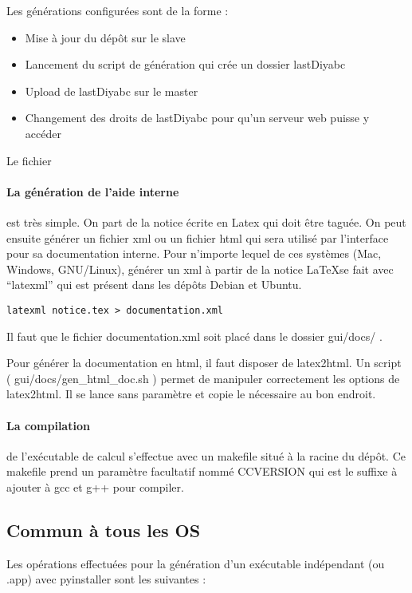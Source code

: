\documentclass[12pt,a4paper]{article}
\begin{document}
    Les générations configurées sont de la forme :\\

    \begin{itemize}
        \item Mise à jour du dépôt sur le slave
        \item Lancement du script de génération qui crée un dossier lastDiyabc
        \item Upload de lastDiyabc sur le master
        \item Changement des droits de lastDiyabc pour qu'un serveur web puisse
            y accéder
    \end{itemize}

    Le fichier


    \paragraph{La génération de l'aide interne} est très simple.
    \label{howtoLatexml}
    On part de la notice écrite en Latex qui doit être taguée. On peut ensuite générer 
    un fichier xml ou un fichier html qui sera utilisé par l'interface pour 
    sa documentation interne.
    Pour n'importe lequel de ces systèmes (Mac, Windows, GNU/Linux), générer 
    un xml à partir de la notice \LaTeX se fait
    avec ``latexml'' qui est présent dans les dépôts Debian et Ubuntu. \\
    \begin{verbatim}latexml notice.tex > documentation.xml\end{verbatim}

    Il faut que le fichier documentation.xml soit placé dans le dossier gui/docs/ .

    Pour générer la documentation en html, il faut disposer de latex2html. Un 
    script ( gui/docs/gen\_html\_doc.sh ) permet de manipuler 
    correctement les options de latex2html. Il se lance sans paramètre 
    et copie le nécessaire au bon endroit.

    \paragraph{La compilation} de l'exécutable de calcul s'effectue avec un makefile situé
    à la racine du dépôt. Ce makefile prend un paramètre facultatif nommé CCVERSION qui est
    le suffixe à ajouter à gcc et g++ pour compiler.


    \subsection{Commun à tous les OS}
        Les opérations effectuées pour la génération d'un exécutable indépendant
        (ou .app) avec pyinstaller sont les suivantes :
\end{document}

